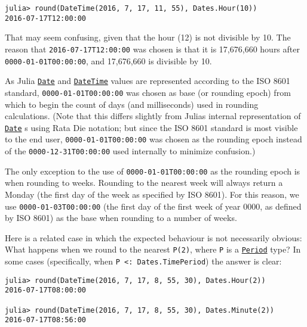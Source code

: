 \begin{verbatim}
julia> round(DateTime(2016, 7, 17, 11, 55), Dates.Hour(10))
2016-07-17T12:00:00
\end{verbatim}



That may seem confusing, given that the hour (12) is not divisible by 10. The reason that \texttt{2016-07-17T12:00:00} was chosen is that it is 17,676,660 hours after \texttt{0000-01-01T00:00:00}, and 17,676,660 is divisible by 10.



As Julia \hyperlink{4488183467971164548}{\texttt{Date}} and \hyperlink{17572689933274889838}{\texttt{DateTime}} values are represented according to the ISO 8601 standard, \texttt{0000-01-01T00:00:00} was chosen as base (or {\textquotedbl}rounding epoch{\textquotedbl}) from which to begin the count of days (and milliseconds) used in rounding calculations. (Note that this differs slightly from Julia{\textquotesingle}s internal representation of \hyperlink{4488183467971164548}{\texttt{Date}} s using Rata Die notation; but since the ISO 8601 standard is most visible to the end user, \texttt{0000-01-01T00:00:00} was chosen as the rounding epoch instead of the \texttt{0000-12-31T00:00:00} used internally to minimize confusion.)



The only exception to the use of \texttt{0000-01-01T00:00:00} as the rounding epoch is when rounding to weeks. Rounding to the nearest week will always return a Monday (the first day of the week as specified by ISO 8601). For this reason, we use \texttt{0000-01-03T00:00:00} (the first day of the first week of year 0000, as defined by ISO 8601) as the base when rounding to a number of weeks.



Here is a related case in which the expected behaviour is not necessarily obvious: What happens when we round to the nearest \texttt{P(2)}, where \texttt{P} is a \hyperlink{17624028548543163266}{\texttt{Period}} type? In some cases (specifically, when \texttt{P <: Dates.TimePeriod}) the answer is clear:




\begin{verbatim}
julia> round(DateTime(2016, 7, 17, 8, 55, 30), Dates.Hour(2))
2016-07-17T08:00:00

julia> round(DateTime(2016, 7, 17, 8, 55, 30), Dates.Minute(2))
2016-07-17T08:56:00
\end{verbatim}



